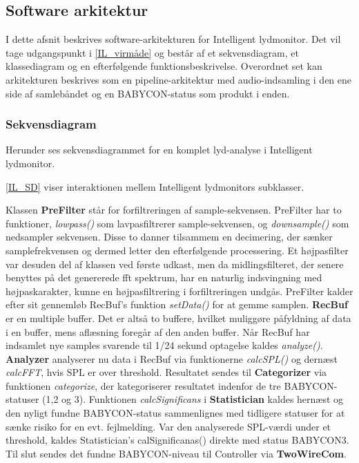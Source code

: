 \subsection{Software arkitektur}
I dette afsnit beskrives software-arkitekturen for Intelligent lydmonitor. Det vil tage udgangspunkt i \ref{IL_virmåde} og består af et sekvensdiagram, et klassediagram og en efterfølgende funktionsbeskrivelse. Overordnet set kan arkitekturen beskrives som en pipeline-arkitektur med audio-indsamling i den ene side af samlebåndet og en BABYCON-status som produkt i enden.

\newpage
\subsubsection*{Sekvensdiagram}
Herunder ses sekvensdiagrammet for en komplet lyd-analyse i Intelligent lydmonitor.

\ref{IL_SD} viser interaktionen mellem Intelligent lydmonitors subklasser.

Klassen \textbf{PreFilter} står for forfiltreringen af sample-sekvensen. PreFilter har to funktioner, \textit{lowpass()} som lavpasfiltrerer sample-sekvensen, og  \textit{downsample()} som nedsampler sekvensen. Disse to danner tilsammem en decimering, der sænker samplefrekvensen og dermed letter den efterfølgende processering. Et højpasfilter var desuden del af klassen ved første udkast, men da midlingsfilteret, der senere benyttes på det genererede fft spektrum, har en naturlig indsvingning med højpaskarakter, kunne en højpasfiltrering i forfiltreringen undgås. PreFilter kalder efter sit gennemløb RecBuf's funktion \textit{setData()} for at gemme samplen.
\textbf{RecBuf} er en multiple buffer. Det er altså to buffere, hvilket muliggøre påfyldning af data i en buffer, mens aflæsning foregår af den anden buffer. Når RecBuf har indsamlet nye samples svarende til 1/24 sekund optagelse kaldes \textit{analyze()}. \textbf{Analyzer} analyserer nu data i RecBuf via funktionerne \textit{calcSPL()} og dernæst \textit{calcFFT}, hvis SPL er over threshold. Resultatet sendes til \textbf{Categorizer} via funktionen \textit{categorize}, der kategoriserer resultatet indenfor de tre BABYCON-statuser (1,2 og 3). Funktionen \textit{calcSignificans} i \textbf{Statistician} kaldes hernæst og den nyligt fundne BABYCON-status sammenlignes med tidligere statuser for at sænke risiko for en evt. fejlmelding. Var den analyserede SPL-værdi under et threshold, kaldes Statistician's calSignificanas() direkte med status BABYCON3. Til slut sendes det fundne BABYCON-niveau til Controller via \textbf{TwoWireCom}. 

